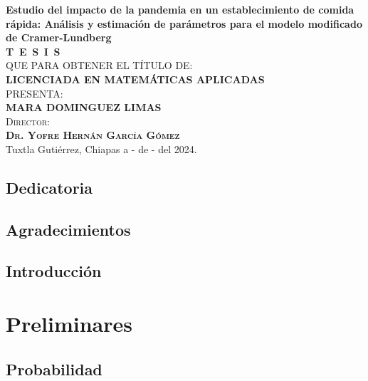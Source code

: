 \documentclass[
  us-letterpaper,
]{scrreprt}
\renewcommand*\contentsname{Tabla de contenidos}
\newcommand\contentsname{Tabla de contenidos}
\theoremstyle{definition}
\theoremstyle{plain}
\theoremstyle{plain}
\theoremstyle{remark}
\begin{document}
\begin{titlepage}
\begin{minipage}[t][0.95\textheight][c]{0.76\textwidth}
            \begin{center}
                {\Large\bfseries Estudio del impacto de la pandemia en un establecimiento de comida rápida: Análisis y estimación de parámetros para el modelo modificado de Cramer-Lundberg}\\[2cm]
                \textsc{\huge \textbf{T\, E\, S\, I\, S}}\\[1.5cm]
                \textsc{\large QUE PARA OBTENER EL TÍTULO DE:}\\[0.3cm]
                \textbf{\textsc{LICENCIADA EN MATEMÁTICAS APLICADAS}}\\[1.5cm]
                \textsc{\large PRESENTA:}\\[0.3cm]
                \textbf{\textsc{\large {MARA DOMINGUEZ LIMAS}}}\\[2cm]
                {\large\scshape Director:\\[0.3cm]
                {\textbf{\large Dr. Yofre Hernán García Gómez }}}\\[2.0cm]
                \large{Tuxtla Gutiérrez, Chiapas a - de - del 2024.}

            \end{center}
\end{minipage}
\end{titlepage}

\pagebreak[2]

\chapter*{Dedicatoria}



\chapter*{Agradecimientos}

\renewcommand*\contentsname{Tabla de contenidos}
{
\hypersetup{linkcolor=}
\setcounter{tocdepth}{2}
\tableofcontents
}

\chapter{Introducción}\label{introducciuxf3n}

\part{Preliminares}

\chapter{Probabilidad}\label{probabilidad}
\end{document}
